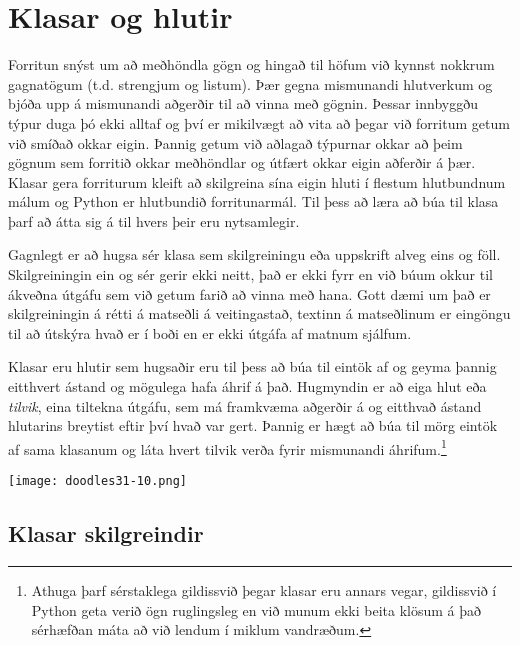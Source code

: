 
\chapter{Klasar og hlutir}\label{k:klasar}
Forritun snýst um að meðhöndla gögn og hingað til höfum við kynnst nokkrum gagnatögum (t.d. strengjum og listum).
Þær gegna mismunandi hlutverkum og bjóða upp á mismunandi aðgerðir til að vinna með gögnin.
Þessar innbyggðu týpur duga þó ekki alltaf og því er mikilvægt að vita að þegar við forritum getum við smíðað okkar eigin.
Þannig getum við aðlagað týpurnar okkar að þeim gögnum sem forritið okkar meðhöndlar og útfært okkar eigin aðferðir á þær.
Klasar gera forriturum kleift að skilgreina sína eigin hluti í flestum hlutbundnum málum og Python er hlutbundið forritunarmál.
Til þess að læra að búa til klasa þarf að átta sig á til hvers þeir eru nytsamlegir.

Gagnlegt er að hugsa sér klasa sem skilgreiningu eða uppskrift alveg eins og föll.
Skilgreiningin ein og sér gerir ekki neitt, það er ekki fyrr en við búum okkur til ákveðna útgáfu sem við getum farið að vinna með hana.
Gott dæmi um það er skilgreiningin á rétti á matseðli á veitingastað, textinn á matseðlinum er eingöngu til að útskýra hvað er í boði en er ekki útgáfa af matnum sjálfum.

Klasar eru hlutir sem hugsaðir eru til þess að búa til eintök af og geyma þannig eitthvert ástand og mögulega hafa áhrif á það.
Hugmyndin er að eiga hlut eða \emph{tilvik}, eina tiltekna útgáfu, sem má framkvæma aðgerðir á og eitthvað ástand hlutarins breytist eftir því hvað var gert.
Þannig er hægt að búa til mörg eintök af sama klasanum og láta hvert tilvik verða fyrir mismunandi áhrifum.\footnote{Athuga þarf sérstaklega gildissvið þegar klasar eru annars vegar, gildissvið í Python geta verið ögn ruglingsleg en við munum ekki beita klösum á það sérhæfðan máta að við lendum í miklum vandræðum.}


\phantom{easter egg}
\begin{center}
	\texttt{[image: doodles31-10.png]}
\end{center}
\section{Klasar skilgreindir}\label{uk:klasar-skilgreindir}

